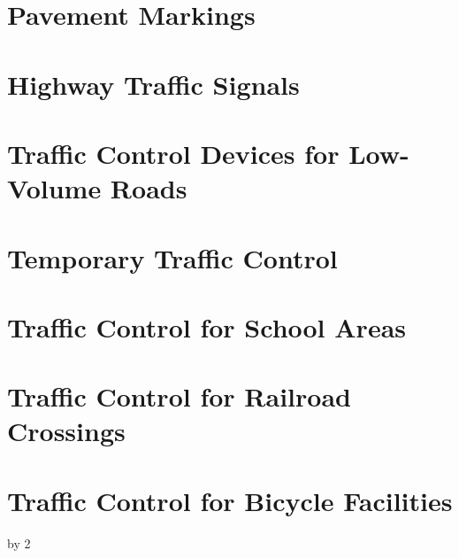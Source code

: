 \documentclass[9pt]{memoir}
\begin{document}
\part{Pavement Markings}



\part{Highway Traffic Signals}



\part{Traffic Control Devices for Low-Volume Roads}



\part{Temporary Traffic Control}



\part{Traffic Control for School Areas}



\part{Traffic Control for Railroad Crossings}



\part{Traffic Control for Bicycle Facilities}







\listoffigures







\listoffigures



\pagestyle{empty}
\cleartoverso
\makeatletter
\setcounter{paragraph}{\the\c@page}
\divide\c@paragraph by 2
\ifodd\c@paragraph\blankpage\else\relax\fi
\makeatother
\cleartoverso

\null\vfill

{\centering\tiny\hrulefill\\\thetitle\par}
\end{document}
